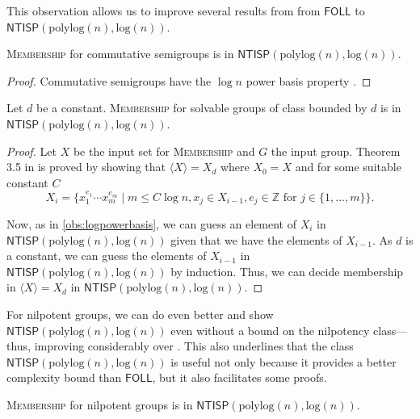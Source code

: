 \documentclass{theoretics}
\newcommand{\algprobm}[1]{\textsc{#1}\xspace}
\newcommand{\Z}{\mathbb{Z}}
\newcommand*{\ComplexityClass}[1]{\ensuremath{\mathsf{#1}}\xspace}
\newcommand{\NTISP}{\ComplexityClass{NTISP}}
\newcommand{\NTISPpll}{\ensuremath{\NTISP(\mathrm{polylog}(n),\mathrm{log}(n))}\xspace}
\newcommand{\FOLL}{\ComplexityClass{FOLL}}
\begin{document}
This observation allows us to improve several results from \cite{BKLM,Fleischer} from \FOLL to \\ \NTISPpll.

\begin{corollary} \label{cor:cayley_abelian}
\algprobm{Membership} for commutative semigroups is in $\NTISPpll$. 
\end{corollary}

\begin{proof} 
Commutative semigroups have the $\log n$ power basis property \cite[Lem.~4.2]{Fleischer}.
\end{proof}


\begin{corollary} 
Let $d$ be a constant. 
\algprobm{Membership} for solvable groups of class bounded by $d$ is in $\NTISPpll$. 
\end{corollary}


\begin{proof}
    Let $X$ be the input set for \algprobm{Membership} and $G$ the input group. 
Theorem 3.5 in \cite{BKLM} is proved by showing that $\langle X  \rangle = X_{d}$ where $X_0 = X$ and for some suitable constant $C$
\[X_i = \{x_1^{e_1} \cdots x_m^{e_m} \mid m \leq C \log n, x_j \in X_{i-1}, e_j \in \Z \text{ for } j \in \{1, \dots, m\}\}.\]

Now, as in \cref{obs:logpowerbasis}, we can guess an element of $X_i$ in \NTISPpll{} given that we have the elements of $X_{i-1}$. As $d$ is a constant, we can guess the elements of $X_{i-1}$ in \NTISPpll{} by induction. Thus, we can decide membership in   $\langle X  \rangle = X_{d}$   in \NTISPpll.
\end{proof}


For nilpotent groups, we can do even better and show \NTISPpll{} even without a bound on the nilpotency class---thus, improving considerably over \cite{BKLM}. This also underlines that the class \NTISPpll{} is useful not only because it provides a better complexity bound than \FOLL, but it also facilitates some proofs.
 
\begin{theorem} 
\algprobm{Membership} for nilpotent groups is in \NTISPpll.
\end{theorem}
\end{document}
